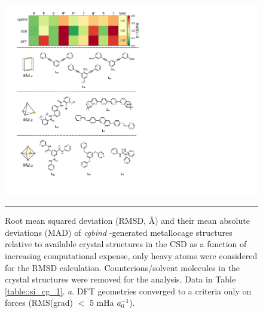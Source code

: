 \documentclass[../../main.tex]{subfiles}
\newcommand{\cgbind}{\emph{cgbind }}
\begin{document}
\begin{figure}[h!]
	\vspace{0.4cm}
	\centering
	\includegraphics[width=13.2cm]{3/cgbind/figs/fig6/fig6}
	\vspace{0.2cm}
	\hrule
	\caption{Root mean squared deviation (RMSD, \AA) and their mean absolute deviations (MAD) of \cgbind-generated metallocage structures relative to available crystal structures in the CSD as a function of increasing computational expense, only heavy atoms were considered for the RMSD calculation. Counterions/solvent molecules in the crystal structures were removed for the analysis. Data in Table \ref{table::si_cg_1}. \emph{a}. DFT geometries converged to a criteria only on forces (RMS(grad) $<$ 5 mHa $a_0^{-1}$).}
	\label{fig::cg_6}
\end{figure}

\clearpage
\end{document}

